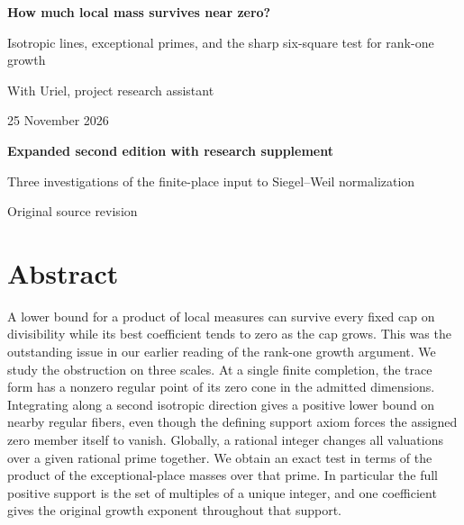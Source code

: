 \documentclass[12pt,letterpaper]{article}
\newcommand{\code}[1]{\texttt{\detokenize{#1}}}
\begin{document}

\thispagestyle{empty}
\begin{center}\par\vspace{.65in}
{\fontsize{33}{39}\selectfont\bfseries\color{ink}How much local mass survives near zero?}\par\vspace{.24in}
\begin{minipage}{.84\linewidth}\centering\Large Isotropic lines, exceptional primes, and the sharp six-square test for rank-one growth\end{minipage}
\par\vspace{.60in}{\large Justin Candler}\par With Uriel, project research assistant\par 25 November 2026
\par\vspace{.40in}\end{center}\vfill
\begin{center}{\sffamily\bfseries Expanded second edition with research supplement}\par\smallskip Three investigations of the finite-place input to Siegel--Weil normalization\par\small Original source revision \code{40e56bab}\end{center}
\clearpage\section*{Abstract}
A lower bound for a product of local measures can survive every fixed cap on divisibility while its best coefficient tends to zero as the cap grows. This was the outstanding issue in our earlier reading of the rank-one growth argument. We study the obstruction on three scales. At a single finite completion, the trace form has a nonzero regular point of its zero cone in the admitted dimensions. Integrating along a second isotropic direction gives a positive lower bound on nearby regular fibers, even though the defining support axiom forces the assigned zero member itself to vanish. Globally, a rational integer changes all valuations over a given rational prime together. We obtain an exact test in terms of the product of the exceptional-place masses over that prime. In particular the full positive support is the set of multiples of a unique integer, and one coefficient gives the original growth exponent throughout that support.
\end{document}
